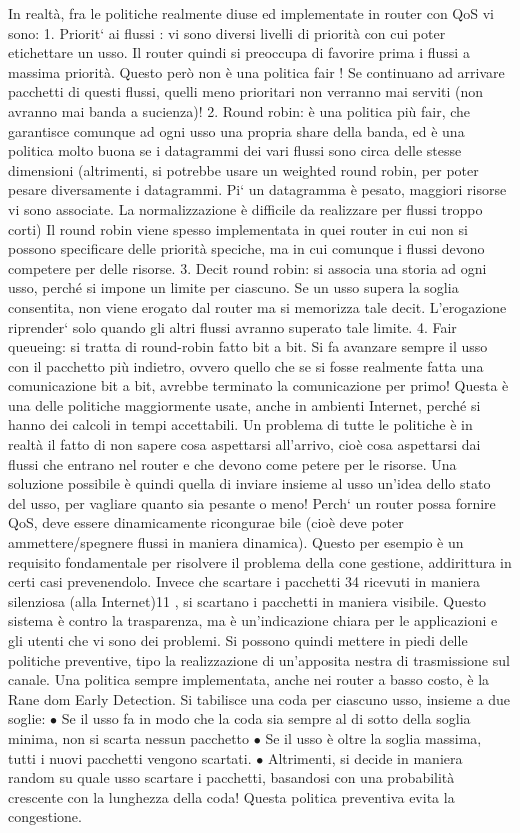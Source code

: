 In realtà, fra le politiche realmente diuse ed implementate in router con
QoS vi sono:
1. Priorit` ai flussi : vi sono diversi livelli di priorità con cui poter etichettare
un usso. Il router quindi si preoccupa di favorire prima i flussi a massima
priorità. Questo però non è una politica fair ! Se continuano ad arrivare
pacchetti di questi flussi, quelli meno prioritari non verranno mai serviti
(non avranno mai banda a sucienza)!
2. Round robin: è una politica più fair, che garantisce comunque ad ogni
usso una propria share della banda, ed è una politica molto buona se i
datagrammi dei vari flussi sono circa delle stesse dimensioni (altrimenti,
si potrebbe usare un weighted round robin, per poter pesare diversamente
i datagrammi. Pi` un datagramma è pesato, maggiori risorse vi sono
associate. La normalizzazione è difficile da realizzare per flussi troppo
corti) Il round robin viene spesso implementata in quei router in cui non
si possono specificare delle priorità speciche, ma in cui comunque i flussi
devono competere per delle risorse.
3. Decit round robin: si associa una storia ad ogni usso, perché si impone
un limite per ciascuno. Se un usso supera la soglia consentita, non viene
erogato dal router ma si memorizza tale decit. L'erogazione riprender`
solo quando gli altri flussi avranno superato tale limite.
4. Fair queueing: si tratta di round-robin fatto bit a bit. Si fa avanzare
sempre il usso con il pacchetto più indietro, ovvero quello che se si fosse
realmente fatta una comunicazione bit a bit, avrebbe terminato la comunicazione per primo! Questa è una delle politiche
maggiormente usate,
anche in ambienti Internet, perché si hanno dei calcoli in tempi accettabili.
Un problema di tutte le politiche è in realtà il fatto di non sapere cosa aspettarsi
all'arrivo, cioè cosa aspettarsi dai flussi che entrano nel router e che devono come
petere per le risorse. Una soluzione possibile è quindi quella di inviare insieme
al usso un'idea dello stato del usso, per vagliare quanto sia pesante o meno!
Perch` un router possa fornire QoS, deve essere dinamicamente ricongurae
bile (cioè deve poter ammettere/spegnere flussi in maniera dinamica). Questo
per esempio è un requisito fondamentale per risolvere il problema della cone
gestione, addirittura in certi casi prevenendolo. Invece che scartare i pacchetti
34
ricevuti in maniera silenziosa (alla Internet)11 , si scartano i pacchetti in maniera
visibile. Questo sistema è contro la trasparenza, ma è un'indicazione chiara per
le applicazioni e gli utenti che vi sono dei problemi. Si possono quindi mettere
in piedi delle politiche preventive, tipo la realizzazione di un'apposita nestra di
trasmissione sul canale.
Una politica sempre implementata, anche nei router a basso costo, è la Rane
dom Early Detection. Si tabilisce una coda per ciascuno usso, insieme a due
soglie:
$\bullet$ Se il usso fa in modo che la coda sia sempre al di sotto della soglia
minima, non si scarta nessun pacchetto
$\bullet$ Se il usso è oltre la soglia massima, tutti i nuovi pacchetti vengono
scartati.
$\bullet$ Altrimenti, si decide in maniera random su quale usso scartare i pacchetti, basandosi con una probabilità
crescente con la lunghezza della
coda!
Questa politica preventiva evita la congestione.
